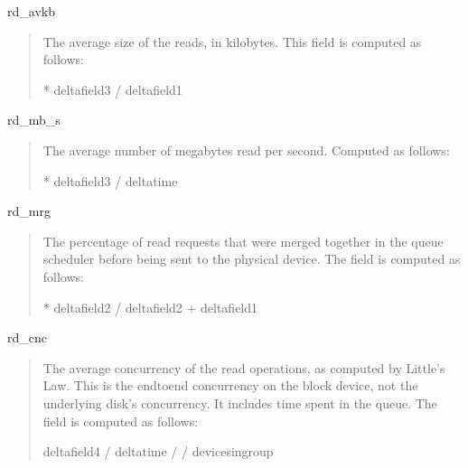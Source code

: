 \documentclass[letterpaper,10pt,english]{sphinxmanual}
\begin{document}
rd\_avkb
\begin{quote}

The average size of the reads, in kilobytes.  This field is computed as follows:

\begin{sphinxVerbatim}[commandchars=\\\{\}]
 * delta\PYG{o}{[}field3\PYG{o}{]} / delta\PYG{o}{[}field1\PYG{o}{]}
\end{sphinxVerbatim}
\end{quote}

rd\_mb\_s
\begin{quote}

The average number of megabytes read per second.  Computed as follows:

\begin{sphinxVerbatim}[commandchars=\\\{\}]
 * delta\PYG{o}{[}field3\PYG{o}{]} / delta\PYG{o}{[}time\PYG{o}{]}
\end{sphinxVerbatim}
\end{quote}

rd\_mrg
\begin{quote}

The percentage of read requests that were merged together in the queue scheduler
before being sent to the physical device.  The field is computed as follows:

\begin{sphinxVerbatim}[commandchars=\\\{\}]
 * delta\PYG{o}{[}field2\PYG{o}{]} / delta\PYG{o}{[}field2\PYG{o}{]} + delta\PYG{o}{[}field1\PYG{o}{]}
\end{sphinxVerbatim}
\end{quote}

rd\_cnc
\begin{quote}

The average concurrency of the read operations, as computed by Little’s Law.
This is the end\sphinxhyphen{}to\sphinxhyphen{}end concurrency on the block device, not the underlying
disk’s concurrency. It includes time spent in the queue.  The field is computed
as follows:

\begin{sphinxVerbatim}[commandchars=\\\{\}]
delta\PYG{o}{[}field4\PYG{o}{]} / delta\PYG{o}{[}time\PYG{o}{]} /  / devices\PYGZhy{}in\PYGZhy{}group
\end{sphinxVerbatim}
\end{quote}
\end{document}
